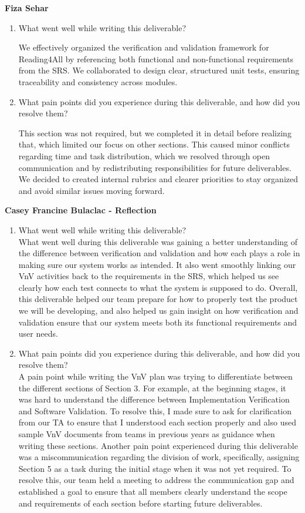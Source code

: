 \documentclass[12pt, titlepage]{article}
\begin{document}
\textbf{Fiza Sehar}
\begin{enumerate}
\item What went well while writing this deliverable?

We effectively organized the verification and validation framework for Reading4All by referencing both functional and non-functional requirements from the SRS. We collaborated to design clear, structured unit tests, ensuring traceability and consistency across modules.

\item What pain points did you experience during this deliverable, and how did you resolve them?

This section was not required, but we completed it in detail before realizing that, which limited our focus on other sections. This caused minor conflicts regarding time and task distribution, which we resolved through open communication and by redistributing responsibilities for future deliverables. We decided to created internal rubrics and clearer priorities to stay organized and avoid similar issues moving forward.

\end{enumerate}

\textbf{Casey Francine Bulaclac - Reflection}
\begin{enumerate}
  \item What went well while writing this deliverable?\\
  What went well during this deliverable was gaining a better understanding of the difference between verification and validation and how each plays a role in making sure 
  our system works as intended. It also went smoothly linking our VnV activities back to the requirements in the SRS, which helped us see clearly how each test connects to what 
  the system is supposed to do. Overall, this deliverable helped our team prepare for how to properly test the product we will be developing, and also helped us gain 
  insight on how verification and validation ensure that our system meets both its functional requirements and user needs.
  \item What pain points did you experience during this deliverable, and how
    did you resolve them?\\
  A pain point while writing the VnV plan was trying to differentiate between the different
  sections of Section 3. For example, at the beginning stages, it was hard to understand the difference between 
  Implementation Verification and Software Validation. To resolve this, I made sure to ask for clarification 
  from our TA to ensure that I understood each section properly and also used sample VnV documents from teams in previous years as 
  guidance when writing these sections. Another pain point experienced during this deliverable was a miscommunication regarding the division 
  of work, specifically, assigning Section 5 as a task during the initial stage when it was not yet required. To resolve this, our team 
  held a meeting to address the communication gap and established a goal to ensure that all members clearly understand the scope and requirements of each section 
  before starting future deliverables. 
\end{enumerate}
\end{document}
